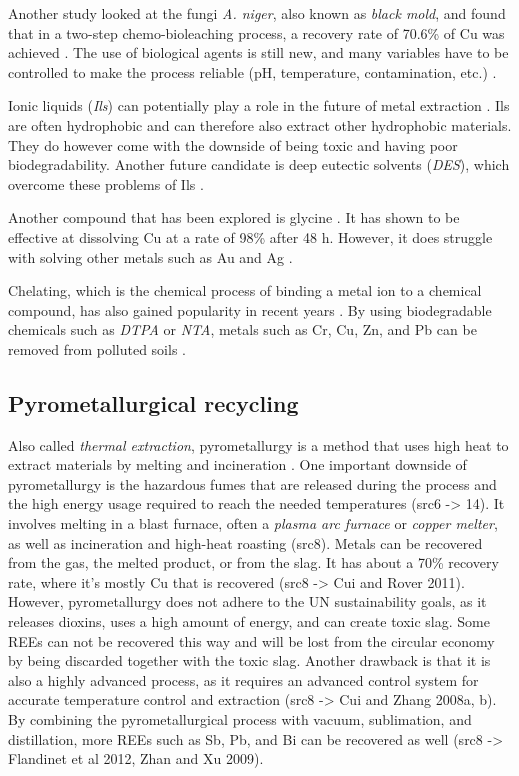 Another study looked at the fungi \textit{A. niger}, also known as \textit{black mold}, and found that in a two-step chemo-bioleaching process, a recovery rate of 70.6\% of Cu was achieved \cite{ANiger}. The use of biological agents is still new, and many variables have to be controlled to make the process reliable (pH, temperature, contamination, etc.) \cite{javed2024}. 

Ionic liquids (\textit{Ils}) can potentially play a role in the future of metal extraction \cite{javed2024}. Ils are often hydrophobic and can therefore also extract other hydrophobic materials. They do however come with the downside of being toxic and having poor biodegradability. Another future candidate is deep eutectic solvents (\textit{DES}), which overcome these problems of Ils \cite{javed2024}. 

Another compound that has been explored is glycine \cite{glycine}. It has shown to be effective at dissolving Cu at a rate of 98\% after 48 h. However, it does struggle with solving other metals such as Au and Ag \cite{javed2024}.

Chelating, which is the chemical process of binding a metal ion to a chemical compound, has also gained popularity in recent years \cite{javed2024}. By using biodegradable chemicals such as \textit{DTPA} or \textit{NTA}, metals such as Cr, Cu, Zn, and Pb can be removed from polluted soils \cite{javed2024}.

\subsection{Pyrometallurgical recycling}

Also called \textit{thermal extraction}, pyrometallurgy is a method that uses high heat to extract materials by melting and incineration \cite{javed2024}. One important downside of pyrometallurgy is the hazardous fumes that are released during the process and the high energy usage required to reach the needed temperatures (src6 -> 14). It involves melting in a blast furnace, often a \textit{plasma arc furnace} or \textit{copper melter}, as well as incineration and high-heat roasting (src8). Metals can be recovered from the gas, the melted product, or from the slag. It has about a 70\% recovery rate, where it's mostly Cu that is recovered (src8 -> Cui and Rover 2011). However, pyrometallurgy does not adhere to the UN sustainability goals, as it releases dioxins, uses a high amount of energy, and can create toxic slag. Some REEs can not be recovered this way and will be lost from the circular economy by being discarded together with the toxic slag. Another drawback is that it is also a highly advanced process, as it requires an advanced control system for accurate temperature control and extraction (src8 -> Cui and Zhang 2008a, b). By combining the pyrometallurgical process with vacuum, sublimation, and distillation, more REEs such as Sb, Pb, and Bi can be recovered as well (src8 -> Flandinet et al 2012, Zhan and Xu 2009).